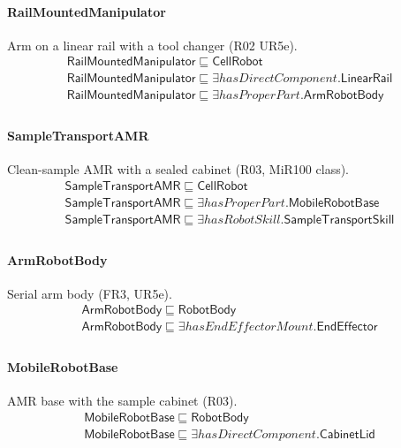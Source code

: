 \documentclass[10pt]{article}
\begin{document}
\paragraph{RailMountedManipulator} Arm on a linear rail with a tool changer (R02 UR5e).
\[\begin{array}{l}
\mathsf{RailMountedManipulator} \sqsubseteq  \mathsf{CellRobot} \\
\mathsf{RailMountedManipulator} \sqsubseteq  \exists \mathit{hasDirectComponent}.\mathsf{LinearRail} \\
\mathsf{RailMountedManipulator} \sqsubseteq  \exists \mathit{hasProperPart}.\mathsf{ArmRobotBody} \\
\end{array}\]
\paragraph{SampleTransportAMR} Clean-sample AMR with a sealed cabinet (R03, MiR100 class).
\[\begin{array}{l}
\mathsf{SampleTransportAMR} \sqsubseteq  \mathsf{CellRobot} \\
\mathsf{SampleTransportAMR} \sqsubseteq  \exists \mathit{hasProperPart}.\mathsf{MobileRobotBase} \\
\mathsf{SampleTransportAMR} \sqsubseteq  \exists \mathit{hasRobotSkill}.\mathsf{SampleTransportSkill} \\
\end{array}\]
\paragraph{ArmRobotBody} Serial arm body (FR3, UR5e).
\[\begin{array}{l}
\mathsf{ArmRobotBody} \sqsubseteq  \mathsf{RobotBody} \\
\mathsf{ArmRobotBody} \sqsubseteq  \exists \mathit{hasEndEffectorMount}.\mathsf{EndEffector} \\
\end{array}\]
\paragraph{MobileRobotBase} AMR base with the sample cabinet (R03).
\[\begin{array}{l}
\mathsf{MobileRobotBase} \sqsubseteq  \mathsf{RobotBody} \\
\mathsf{MobileRobotBase} \sqsubseteq  \exists \mathit{hasDirectComponent}.\mathsf{CabinetLid} \\
\end{array}\]
\end{document}
